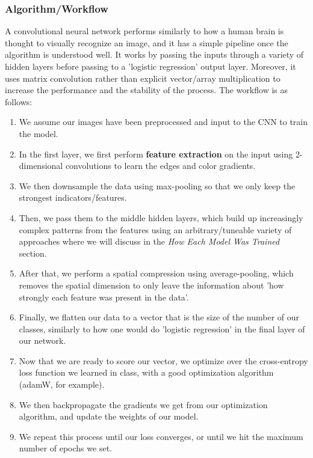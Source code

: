 \documentclass[10pt]{article} %
\begin{document}
\subsubsection{Algorithm/Workflow}
    A convolutional neural network performs similarly to how a human brain is thought to visually recognize an image, and it has a simple pipeline once the algorithm is understood well. It works by passing the inputs through a variety of hidden layers before passing to a 'logistic regression' output layer. Moreover, it uses matrix convolution rather than explicit vector/array multiplication to increase the performance and the stability of the process. The workflow is as follows:\begin{enumerate}
        \item We assume our images have been preprocessed and input to the CNN to train the model.
        \item In the first layer, we first perform \textbf{feature extraction} on the input using 2-dimensional convolutions to learn the edges and color gradients.
        \item We then downsample the data using max-pooling so that we only keep the strongest indicators/features.
        \item Then, we pass them to the middle hidden layers, which build up increasingly complex patterns from the features using an arbitrary/tuneable variety of approaches where we will discuss in the \textit{How Each Model Was Trained} section.
        \item After that, we perform a spatial compression using average-pooling, which removes the spatial dimension to only leave the information about 'how strongly each feature was present in the data'.
        \item Finally, we flatten our data to a vector that is the size of the number of our classes, similarly to how one would do 'logistic regression' in the final layer of our network.
        \item Now that we are ready to score our vector, we optimize over the cross-entropy loss function we learned in class, with a good optimization algorithm (adamW, for example).
        \item We then backpropagate the gradients we get from our optimization algorithm, and update the weights of our model.
        \item We repeat this process until our loss converges, or until we hit the maximum number of epochs we set.
    \end{enumerate}
\end{document}
